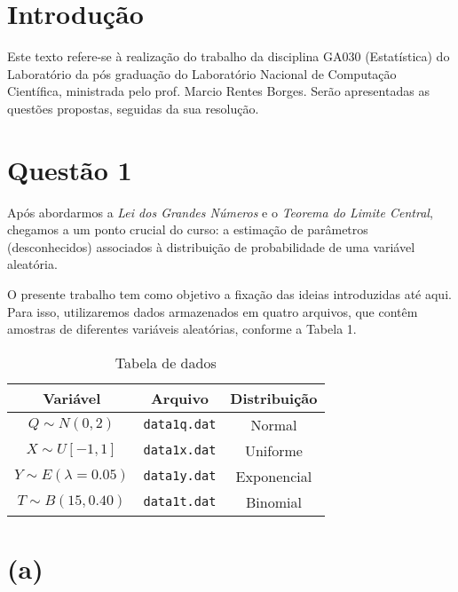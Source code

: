 \documentclass[]{abntex2}
\begin{document}
\frenchspacing 

\maketitle

\section*{\textbf{Introdução}}

Este texto refere-se à realização do trabalho da disciplina GA030 (Estatística) do Laboratório da pós graduação do Laboratório Nacional de Computação Científica, ministrada pelo prof. Marcio Rentes Borges. Serão apresentadas as questões propostas, seguidas da sua resolução.

\section*{\textbf{Questão 1}}
\noindent Após abordarmos a \textit{Lei dos Grandes Números} e o \textit{Teorema do Limite Central}, chegamos a um ponto crucial do curso: a estimação de parâmetros (desconhecidos) associados à distribuição de probabilidade de uma variável aleatória.

\noindent O presente trabalho tem como objetivo a fixação das ideias introduzidas até aqui. Para isso, utilizaremos dados armazenados em quatro arquivos, que contêm amostras de diferentes variáveis aleatórias, conforme a Tabela 1.

\begin{table}[H]
    \centering
    \begin{tabular}{|c|c|c|}
        \hline
        \textbf{Variável} & \textbf{Arquivo} & \textbf{Distribuição} \\
        \hline
        $Q \sim N(0, 2)$ & \texttt{data1q.dat} & Normal \\
        $X \sim U[-1, 1]$ & \texttt{data1x.dat} & Uniforme \\
        $Y \sim E(\lambda = 0.05)$ & \texttt{data1y.dat} & Exponencial \\
        $T \sim B(15, 0.40)$ & \texttt{data1t.dat} & Binomial \\
        \hline
    \end{tabular}
    \caption{Tabela de dados}
    \label{tab:dados}
\end{table}

\section*{\textbf{(a)}}
\end{document}
